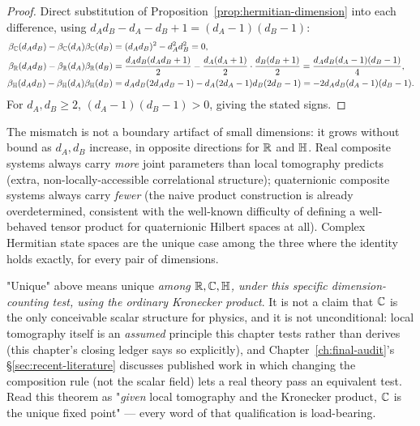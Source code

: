 \begin{proof}
Direct substitution of Proposition~\ref{prop:hermitian-dimension} into each
difference, using $d_Ad_B - d_A - d_B + 1 = (d_A-1)(d_B-1)$:
\begin{align}
\beta_{\mathbb{C}}(d_Ad_B) - \beta_{\mathbb{C}}(d_A)\beta_{\mathbb{C}}(d_B) &= (d_Ad_B)^2 - d_A^2 d_B^2 = 0,\\
\beta_{\mathbb{R}}(d_Ad_B) - \beta_{\mathbb{R}}(d_A)\beta_{\mathbb{R}}(d_B) &= \frac{d_Ad_B(d_Ad_B+1)}{2} -
\frac{d_A(d_A+1)}{2}\cdot\frac{d_B(d_B+1)}{2} = \frac{d_Ad_B(d_A-1)(d_B-1)}{4},\\
\beta_{\mathbb{H}}(d_Ad_B) - \beta_{\mathbb{H}}(d_A)\beta_{\mathbb{H}}(d_B) &= d_Ad_B(2d_Ad_B-1) -
d_A(2d_A-1)d_B(2d_B-1) = -2d_Ad_B(d_A-1)(d_B-1).
\end{align}
For $d_A,d_B \ge 2$, $(d_A-1)(d_B-1) > 0$, giving the stated signs.
\end{proof}

\begin{remark}
The mismatch is not a boundary artifact of small dimensions: it grows without
bound as $d_A,d_B$ increase, in opposite directions for $\mathbb{R}$ and $\mathbb{H}$. Real
composite systems always carry \emph{more} joint parameters than local
tomography predicts (extra, non-locally-accessible correlational structure);
quaternionic composite systems always carry \emph{fewer} (the naive product
construction is already overdetermined, consistent with the well-known
difficulty of defining a well-behaved tensor product for quaternionic Hilbert
spaces at all). Complex Hermitian state spaces are the unique case among the
three where the identity holds exactly, for every pair of dimensions.
\end{remark}

\begin{scopebox}
\scopetitle{}"Unique" above means unique \emph{among $\mathbb{R},\mathbb{C},\mathbb{H}$, under
this specific dimension-counting test, using the ordinary Kronecker
product}. It is not a claim that $\mathbb{C}$ is the only conceivable scalar
structure for physics, and it is not unconditional: local tomography
itself is an \emph{assumed} principle this chapter tests rather than
derives (this chapter's closing ledger says so explicitly), and
Chapter~\ref{ch:final-audit}'s \S\ref{sec:recent-literature} discusses
published work in which changing the composition rule (not the scalar
field) lets a real theory pass an equivalent test. Read this theorem as
"\emph{given} local tomography and the Kronecker product, $\mathbb{C}$ is the
unique fixed point" — every word of that qualification is load-bearing.
\end{scopebox}

